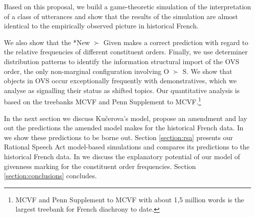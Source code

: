 \documentclass[output=paper,modfonts,nonflat]{langsci/langscibook}
\begin{document}
Based on this proposal, we build a game-theoretic simulation of the interpretation of a class of utterances and show that the results of the simulation are almost identical to the empirically observed picture in historical French. 

We also show that the *New $\succ$ Given makes a correct prediction with regard to the relative frequencies of different constituent orders. Finally, we use determiner distribution patterns to identify the information structural import of the OVS order, the only non-marginal configuration involving O $\succ$ S. We show that objects in OVS occur exceptionally frequently with demonstratives, which we analyse as signalling their status as shifted topics. Our quantitative analysis is based on the treebanks MCVF and Penn Supplement to MCVF.\footnote{MCVF and Penn Supplement to MCVF with about 1,5 million words is the largest treebank for French diachrony to date.} 

In the next section we discuss Ku\v{c}erova's model, propose an amendment and lay out the predictions the amended model makes for the historical French data. In  we show these predictions to be borne out. Section \ref{section:rsa} presents our Rational Speech Act model-based simulations and compares its predictions to the historical French data. In  we discuss the explanatory potential of our model of givenness marking for the constituent order frequencies. Section \ref{section:conclusions} concludes. 

\nocite{MCVF}
\nocite{Penn}


\end{document}

